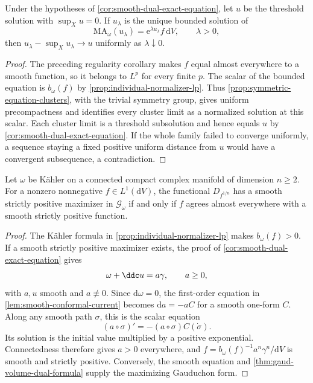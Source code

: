 \begin{corollary}\label{cor:smooth-dual-exponential-limit}
Under the hypotheses of \cref{cor:smooth-dual-exact-equation}, let $u$ be the threshold solution with $\sup_Xu=0$. If $u_\lambda$ is the unique bounded solution of
\[
 \mathrm{MA}_\omega(u_\lambda)=\mathrm{e}^{\lambda u_\lambda}f\,\mathrm{d}V,
 \qquad\lambda>0,
\]
then $u_\lambda-\sup_Xu_\lambda\to u$ uniformly as $\lambda\downarrow0$.
\end{corollary}
\begin{proof}
The preceding regularity corollary makes $f$ equal almost everywhere to a smooth function, so it belongs to $L^p$ for every finite $p$. The scalar of the bounded equation is $b_\omega(f)$ by \cref{prop:individual-normalizer-lp}. Thus \cref{prop:symmetric-equation-clusters}, with the trivial symmetry group, gives uniform precompactness and identifies every cluster limit as a normalized solution at this scalar. Each cluster limit is a threshold subsolution and hence equals $u$ by \cref{cor:smooth-dual-exact-equation}. If the whole family failed to converge uniformly, a sequence staying a fixed positive uniform distance from $u$ would have a convergent subsequence, a contradiction.
\end{proof}

\begin{corollary}\label{cor:kahler-smooth-dual-attainment}
Let $\omega$ be K\"ahler on a connected compact complex manifold of dimension $n\geq2$. For a nonzero nonnegative $f\in L^1(\mathrm{d}V)$, the functional $D_{f^{1/n}}$ has a smooth strictly positive maximizer in $\mathscr G_\omega$ if and only if $f$ agrees almost everywhere with a smooth strictly positive function.
\end{corollary}
\begin{proof}
The K\"ahler formula in \cref{prop:individual-normalizer-lp} makes $b_\omega(f)>0$. If a smooth strictly positive maximizer exists, the proof of \cref{cor:smooth-dual-exact-equation} gives
\[
 \omega+\ddc u=a\gamma,
 \qquad a\geq0,
\]
with $a,u$ smooth and $a\not\equiv0$. Since $\mathrm{d}\omega=0$, the first-order equation in \cref{lem:smooth-conformal-current} becomes $\mathrm{d}a=-aC$ for a smooth one-form $C$. Along any smooth path $\sigma$, this is the scalar equation
\[
 (a\circ\sigma)'=-(a\circ\sigma)C(\dot\sigma).
\]
Its solution is the initial value multiplied by a positive exponential. Connectedness therefore gives $a>0$ everywhere, and $f=b_\omega(f)^{-1}a^n\gamma^n/\mathrm{d}V$ is smooth and strictly positive. Conversely, the smooth equation and \cref{thm:gaud-volume-dual-formula} supply the maximizing Gauduchon form.
\end{proof}

